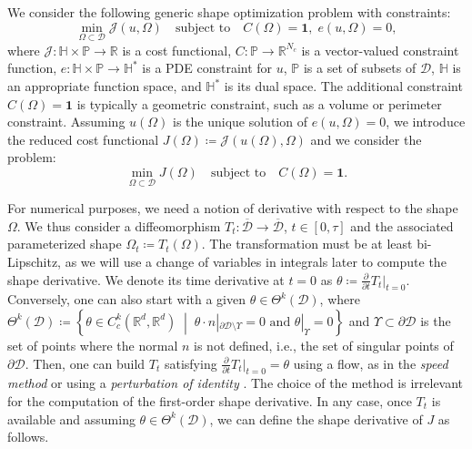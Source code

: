 \documentclass[preprint,9pt]{elsarticle}
\begin{document}
We consider the following generic shape optimization problem with constraints:
\begin{equation}\label{eq:problem0}
	\min_{\Omega\subset\mathcal{D}} \mathcal{J}(u,\Omega)
	\quad\text{subject to}\quad C(\Omega)=\boldsymbol{1},\; e(u,\Omega)=0,
\end{equation}
where $\mathcal{J}\colon\mathbb{H}\times\mathds{P}\to\mathds{R}$ is a cost functional, 
$C\colon\mathds{P}\to\mathds{R}^{N_c}$ is a vector-valued constraint function,
$e\colon\mathbb{H}\times\mathds{P}\to\mathbb{H}^*$ is a PDE constraint for $u$,
$\mathds{P}$ is a set of subsets of $\mathcal{D}$,
$\mathbb{H}$ is an appropriate function space, and $\mathbb{H}^*$ is its dual space.
The additional constraint $C(\Omega)=\boldsymbol{1}$ is
typically a geometric constraint, such as a volume or perimeter constraint.
Assuming $u(\Omega)$ is the unique solution of $e(u,\Omega)=0$, 
we introduce the reduced cost functional
$J(\Omega)\coloneqq\mathcal{J}(u(\Omega),\Omega)$
and we consider the problem:
\begin{equation}\label{eq:problem}
	\min_{\Omega\subset\mathcal{D}} J(\Omega)
	\quad\text{subject to}\quad C(\Omega)=\boldsymbol{1}.
\end{equation}

For numerical purposes, we need a notion of derivative with respect
to the shape $\Omega$.
We thus consider a diffeomorphism
$T_t\colon\overline{\mathcal{D}}\to\overline{\mathcal{D}}$, $t\in [0,\tau]$
and the associated parameterized shape $\Omega_t\coloneqq T_t(\Omega)$.
The transformation must be at least bi-Lipschitz, as we will use a change
of variables in integrals later to compute the shape derivative.
We denote its time derivative at $t=0$ as
$\theta\coloneqq\frac{\partial}{\partial t}T_t|_{t=0}$.
Conversely, one can also start with a given $\theta\in\Theta^k(\mathcal{D})$,
where  
$
	\Theta^k(\mathcal{D})\coloneqq
	\left\{
		\theta \in C^k_c(\mathds{R}^d,\mathds{R}^d)
		\;\middle|\;
		{\theta\cdot n}|_{\partial\mathcal{D}\setminus \Upsilon} = 0
		\text{ and }
		\theta|_\Upsilon = 0
	\right\}
$
and $\Upsilon\subset\partial\mathcal{D}$ is the set of points
where the normal $n$ is not defined, i.e.,
the set of singular points of $\partial\mathcal{D}$.
Then, one can build $T_t$ satisfying
$\frac{\partial}{\partial t} T_t|_{t=0}=\theta$ using a flow,
as in the {\it speed method} \citep{MR2731611,MR1215733} or
using a {\it perturbation of identity} \citep{MR3791463}.
The choice of the method is irrelevant for the computation
of the first-order shape derivative.
In any case, once $T_t$ is available and assuming
$\theta\in\Theta^k(\mathcal{D})$, we can define
the shape derivative of $J$ as follows.
\end{document}
